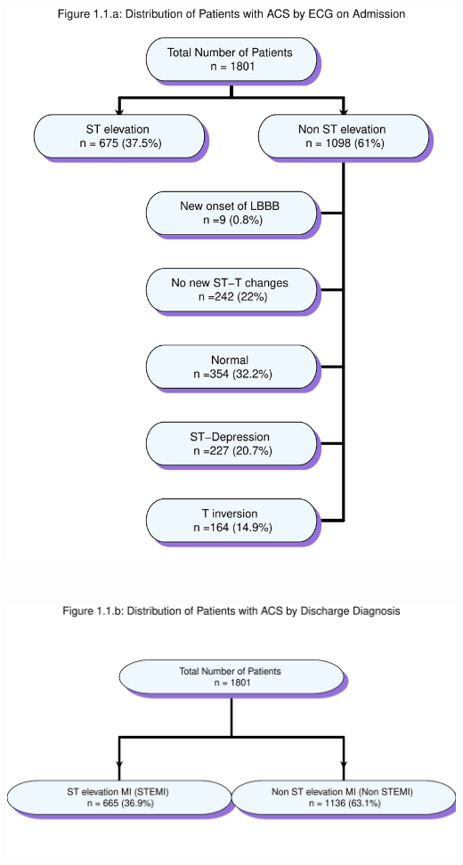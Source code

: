 \documentclass[
]{article}
\begin{document}
\includegraphics{‏‏ACSIS_2024_v1_with_trend_pdf_files/figure-latex/unnamed-chunk-6-1.pdf}

\pagebreak

~

\includegraphics{‏‏ACSIS_2024_v1_with_trend_pdf_files/figure-latex/unnamed-chunk-7-1.pdf}

\pagebreak
\end{document}
